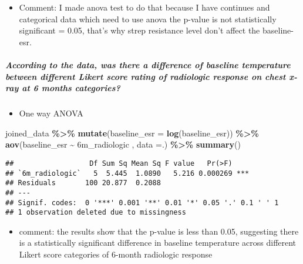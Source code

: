 \documentclass[
]{article}
\newenvironment{Shaded}{\begin{snugshade}}{\end{snugshade}}
\newcommand{\AttributeTok}[1]{\textcolor[rgb]{0.13,0.29,0.53}{#1}}
\newcommand{\FunctionTok}[1]{\textcolor[rgb]{0.13,0.29,0.53}{\textbf{#1}}}
\newcommand{\NormalTok}[1]{#1}
\newcommand{\SpecialCharTok}[1]{\textcolor[rgb]{0.81,0.36,0.00}{\textbf{#1}}}
\newcommand{\StringTok}[1]{\textcolor[rgb]{0.31,0.60,0.02}{#1}}
\providecommand{\tightlist}{%
  \setlength{\itemsep}{0pt}\setlength{\parskip}{0pt}}
\begin{document}
\begin{itemize}
\tightlist
\item
  Comment: I made anova test to do that because I have continues and
  categorical data which need to use anova the p-value is not
  statistically significant = 0.05, that's why strep resistance level
  don't affect the baseline-esr.
\end{itemize}

\subparagraph{According to the data, was there a difference of baseline
temperature between different Likert score rating of radiologic response
on chest x-ray at 6 months
categories?}\label{according-to-the-data-was-there-a-difference-of-baseline-temperature-between-different-likert-score-rating-of-radiologic-response-on-chest-x-ray-at-6-months-categories}

\begin{itemize}
\tightlist
\item
  One way ANOVA
\end{itemize}

\begin{Shaded}
\begin{Highlighting}[]
\NormalTok{joined\_data }\SpecialCharTok{\%\textgreater{}\%}
  \FunctionTok{mutate}\NormalTok{(}\AttributeTok{baseline\_esr =} \FunctionTok{log}\NormalTok{(baseline\_esr)) }\SpecialCharTok{\%\textgreater{}\%} \FunctionTok{aov}\NormalTok{(baseline\_esr }\SpecialCharTok{\textasciitilde{}} \StringTok{\textasciigrave{}}\AttributeTok{6m\_radiologic}\StringTok{\textasciigrave{}}\NormalTok{ , }\AttributeTok{data =}\NormalTok{.) }\SpecialCharTok{\%\textgreater{}\%}
  \FunctionTok{summary}\NormalTok{()}
\end{Highlighting}
\end{Shaded}

\begin{verbatim}
##                  Df Sum Sq Mean Sq F value   Pr(>F)    
## `6m_radiologic`   5  5.445  1.0890   5.216 0.000269 ***
## Residuals       100 20.877  0.2088                     
## ---
## Signif. codes:  0 '***' 0.001 '**' 0.01 '*' 0.05 '.' 0.1 ' ' 1
## 1 observation deleted due to missingness
\end{verbatim}

\begin{itemize}
\tightlist
\item
  comment: the results show that the p-value is less than 0.05,
  suggesting there is a statistically significant difference in baseline
  temperature across different Likert score categories of 6-month
  radiologic response
\end{itemize}
\end{document}
